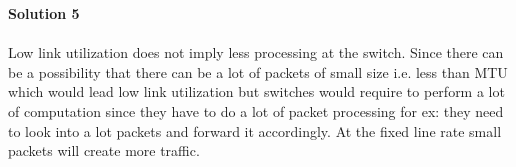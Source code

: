 \documentclass[letterpaper, 11pt]{article}
\begin{document}
\textbf{Solution 5}\\ \\
Low link utilization does not imply less processing at the switch. Since there can be a possibility that there can be a lot of packets of small size i.e. less than MTU which would lead low link utilization but switches would require to perform a lot of computation since they have to do a lot of packet processing for ex: they need to look into a lot packets and forward it accordingly. At the fixed line rate small packets will create more traffic.
\bigskip

\clearpage

\end{document}
